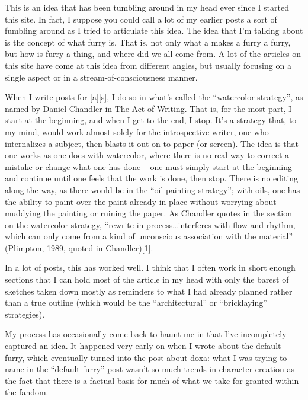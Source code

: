 
This is an idea that has been tumbling around in my head ever since I started this site. In fact, I suppose you could call a lot of my earlier posts a sort of fumbling around as I tried to articulate this idea. The idea that I'm talking about is the concept of what furry is. That is, not only what a makes a furry a furry, but how is furry a thing, and where did we all come from. A lot of the articles on this site have come at this idea from different angles, but usually focusing on a single aspect or in a stream-of-consciousness manner.

When I write posts for [a][s], I do so in what's called the ``watercolor strategy'', as named by Daniel Chandler in The Act of Writing. That is, for the most part, I start at the beginning, and when I get to the end, I stop. It's a strategy that, to my mind, would work almost solely for the introspective writer, one who internalizes a subject, then blasts it out on to paper (or screen). The idea is that one works as one does with watercolor, where there is no real way to correct a mistake or change what one has done -- one must simply start at the beginning and continue until one feels that the work is done, then stop. There is no editing along the way, as there would be in the ``oil painting strategy''; with oils, one has the ability to paint over the paint already in place without worrying about muddying the painting or ruining the paper. As Chandler quotes in the section on the watercolor strategy, ``rewrite in process…interferes with flow and rhythm, which can only come from a kind of unconscious association with the material'' (Plimpton, 1989, quoted in Chandler)[1].

In a lot of posts, this has worked well. I think that I often work in short enough sections that I can hold most of the article in my head with only the barest of sketches taken down mostly as reminders to what I had already planned rather than a true outline (which would be the ``architectural'' or ``bricklaying'' strategies).

My process has occasionally come back to haunt me in that I've incompletely captured an idea. It happened very early on when I wrote about the default furry, which eventually turned into the post about doxa: what I was trying to name in the ``default furry'' post wasn't so much trends in character creation as the fact that there is a factual basis for much of what we take for granted within the fandom.

